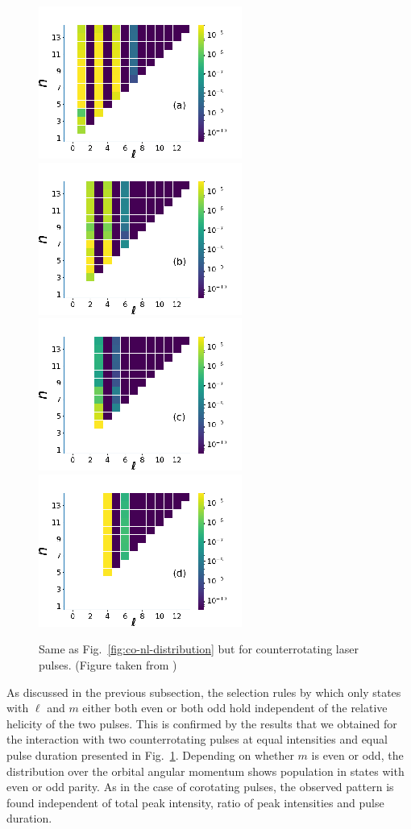\begin{figure}[!ht]
\centering
\includegraphics[width=0.24\columnwidth]{figs/Rydberg/Gebre-bicircular-Fig6a.png}
\includegraphics[width=0.24\columnwidth]{figs/Rydberg/Gebre-bicircular-Fig6b.png}
\includegraphics[width=0.24\columnwidth]{figs/Rydberg/Gebre-bicircular-Fig6c.png}
\includegraphics[width=0.24\columnwidth]{figs/Rydberg/Gebre-bicircular-Fig6d.png}
\caption{\label{fig:counter-nl-distribution}
Same as Fig.\ \ref{fig:co-nl-distribution} but for counterrotating laser pulses. (Figure taken from \cite{venzke2020_ryd})
}
\end{figure}

As discussed in the previous subsection, the selection rules by which only states with $\ell$ and $m$ either both even or both odd hold independent of the relative helicity of the two pulses. This is confirmed by the results that we obtained for the interaction with two counterrotating pulses at equal intensities and equal pulse duration presented in Fig.\ \ref{fig:counter-nl-distribution}. Depending on whether $m$ is even or odd, the distribution over the orbital angular momentum shows population in states with even or odd parity. As in the case of corotating pulses, the observed pattern is found independent of total peak intensity, ratio of peak intensities and pulse duration.


